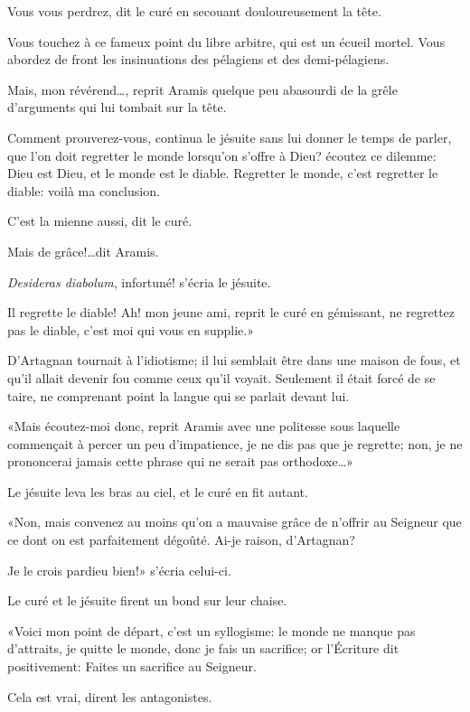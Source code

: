 \speak  Vous vous perdrez, dit le curé en secouant douloureusement la tête. 

\speak  Vous touchez à ce fameux point du libre arbitre, qui est un écueil mortel. Vous abordez de front les insinuations des pélagiens et des demi-pélagiens. 

\speak  Mais, mon révérend\dots, reprit Aramis quelque peu abasourdi de la grêle d'arguments qui lui tombait sur la tête. 

\speak  Comment prouverez-vous, continua le jésuite sans lui donner le temps de parler, que l'on doit regretter le monde lorsqu'on s'offre à Dieu? écoutez ce dilemme: Dieu est Dieu, et le monde est le diable. Regretter le monde, c'est regretter le diable: voilà ma conclusion. 

\speak  C'est la mienne aussi, dit le curé. 

\speak  Mais de grâce!\dots dit Aramis. 

\speak  \textit{Desideras diabolum}, infortuné! s'écria le jésuite. 

\speak  Il regrette le diable! Ah! mon jeune ami, reprit le curé en gémissant, ne regrettez pas le diable, c'est moi qui vous en supplie.» 

D'Artagnan tournait à l'idiotisme; il lui semblait être dans une maison de fous, et qu'il allait devenir fou comme ceux qu'il voyait. Seulement il était forcé de se taire, ne comprenant point la langue qui se parlait devant lui. 

«Mais écoutez-moi donc, reprit Aramis avec une politesse sous laquelle commençait à percer un peu d'impatience, je ne dis pas que je regrette; non, je ne prononcerai jamais cette phrase qui ne serait pas orthodoxe\dots» 

Le jésuite leva les bras au ciel, et le curé en fit autant. 

«Non, mais convenez au moins qu'on a mauvaise grâce de n'offrir au Seigneur que ce dont on est parfaitement dégoûté. Ai-je raison, d'Artagnan? 

\speak  Je le crois pardieu bien!» s'écria celui-ci. 

Le curé et le jésuite firent un bond sur leur chaise. 

«Voici mon point de départ, c'est un syllogisme: le monde ne manque pas d'attraits, je quitte le monde, donc je fais un sacrifice; or l'Écriture dit positivement: Faites un sacrifice au Seigneur. 

\speak  Cela est vrai, dirent les antagonistes. 

